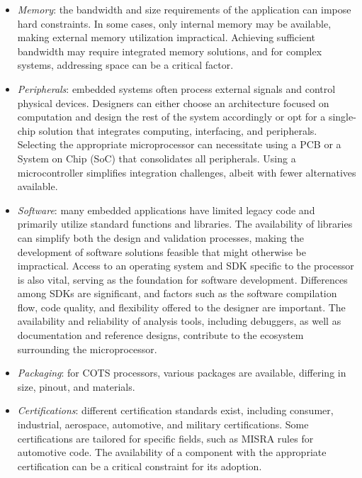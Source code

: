 \begin{itemize}
    \item \textit{Memory}: the bandwidth and size requirements of the application can impose hard constraints. 
        In some cases, only internal memory may be available, making external memory utilization impractical. 
        Achieving sufficient bandwidth may require integrated memory solutions, and for complex systems, addressing space can be a critical factor.
    \item \textit{Peripherals}: embedded systems often process external signals and control physical devices. 
        Designers can either choose an architecture focused on computation and design the rest of the system accordingly or opt for a single-chip solution that integrates computing, interfacing, and peripherals. 
        Selecting the appropriate microprocessor can necessitate using a PCB or a System on Chip (SoC) that consolidates all peripherals. 
        Using a microcontroller simplifies integration challenges, albeit with fewer alternatives available.
    \item \textit{Software}: many embedded applications have limited legacy code and primarily utilize standard functions and libraries. 
        The availability of libraries can simplify both the design and validation processes, making the development of software solutions feasible that might otherwise be impractical. 
        Access to an operating system and SDK specific to the processor is also vital, serving as the foundation for software development. 
        Differences among SDKs are significant, and factors such as the software compilation flow, code quality, and flexibility offered to the designer are important. 
        The availability and reliability of analysis tools, including debuggers, as well as documentation and reference designs, contribute to the ecosystem surrounding the microprocessor.
    \item \textit{Packaging}: for COTS processors, various packages are available, differing in size, pinout, and materials.
    \item \textit{Certifications}: different certification standards exist, including consumer, industrial, aerospace, automotive, and military certifications. 
        Some certifications are tailored for specific fields, such as MISRA rules for automotive code. 
        The availability of a component with the appropriate certification can be a critical constraint for its adoption.
\end{itemize}